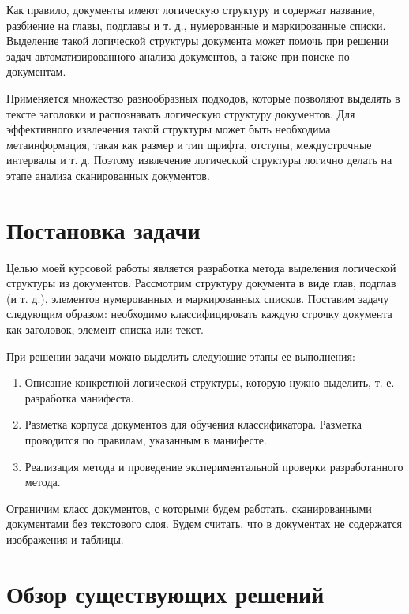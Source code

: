 \documentclass[a4paper,12pt]{article}
\begin{document}
Как правило, документы имеют логическую структуру и содержат название, разбиение на главы, подглавы и т. д., нумерованные и маркированные списки. Выделение такой логической структуры документа может помочь при решении задач автоматизированного анализа документов, а также при поиске по документам.

Применяется множество разнообразных подходов, которые позволяют выделять в тексте заголовки и распознавать логическую структуру документов.
Для эффективного извлечения такой структуры может быть необходима метаинформация, такая как размер и тип шрифта, отступы, междустрочные интервалы и т. д. 
Поэтому извлечение логической структуры логично делать на этапе анализа сканированных документов.

\newpage
\section{Постановка задачи}

Целью моей курсовой работы является разработка метода выделения логической структуры из документов. Рассмотрим структуру документа в виде глав, подглав (и т. д.), элементов нумерованных и маркированных списков.
Поставим задачу следующим образом: необходимо классифицировать каждую строчку документа как заголовок, элемент списка или текст.

При решении задачи можно выделить следующие этапы ее выполнения:

\begin{enumerate}
\item Описание конкретной логической структуры, которую нужно выделить, т. е. разработка манифеста.

\item Разметка корпуса документов для обучения классификатора. Разметка проводится по правилам, указанным в манифесте. 

\item Реализация метода и проведение экспериментальной проверки разработанного метода.
\end{enumerate}

Ограничим класс документов, с которыми будем работать, сканированными документами без текстового слоя. Будем считать, что в документах не содержатся изображения и таблицы. 

\newpage
\section{Обзор существующих решений}
\end{document}
